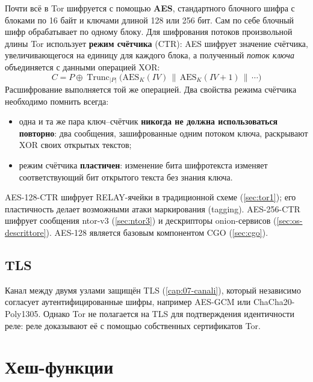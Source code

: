 Почти всё в Tor шифруется с помощью \textbf{AES}, стандартного блочного шифра с блоками по 16 байт и ключами длиной 128 или 256 бит. Сам по себе блочный шифр обрабатывает по одному блоку. Для шифрования потоков произвольной длины Tor использует \textbf{режим счётчика} (CTR): AES шифрует значение счётчика, увеличивающегося на единицу для каждого блока, а полученный \emph{поток ключа} объединяется с данными операцией XOR:
\[ C = P \oplus \operatorname{Trunc}_{|P|}\bigl(\mathrm{AES}_K(\mathit{IV}) \,\|\, \mathrm{AES}_K(\mathit{IV}+1) \,\|\, \cdots\bigr) \]
Расшифрование выполняется той же операцией. Два свойства режима счётчика необходимо помнить всегда:
\begin{itemize}
  \item одна и та же пара ключ--счётчик \textbf{никогда не должна использоваться повторно}: два сообщения, зашифрованные одним потоком ключа, раскрывают XOR своих открытых текстов;
  \item режим счётчика \textbf{пластичен}: изменение бита шифротекста изменяет соответствующий бит открытого текста без знания ключа.
\end{itemize}
AES-128-CTR шифрует RELAY-ячейки в традиционной схеме (\cref{sec:tor1}); его пластичность делает возможными атаки маркирования (tagging). AES-256-CTR шифрует сообщения ntor-v3 (\cref{sec:ntor3}) и дескрипторы onion-сервисов (\cref{sec:os-descrittore}). AES-128 является базовым компонентом CGO (\cref{sec:cgo}).

\subsection{TLS}

Канал между двумя узлами защищён TLS (\cref{cap:07-canali}), который независимо согласует аутентифицированные шифры, например AES-GCM или ChaCha20-Poly1305. Однако Tor не полагается на TLS для подтверждения идентичности реле: реле доказывают её с помощью собственных сертификатов Tor.

\section{Хеш-функции}\label{sec:cripto-hash}

